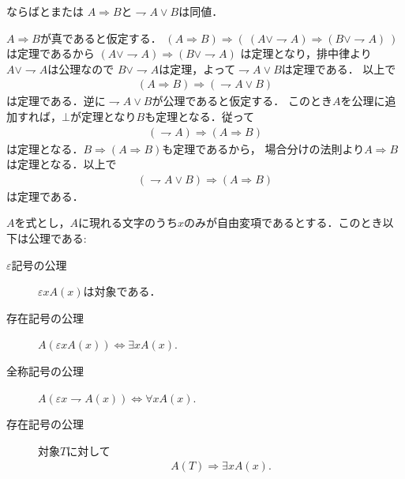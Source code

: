 	\begin{itembox}[l]{ならばとまたは}
		$A \Longrightarrow B$と$\rightharpoondown A \vee B$は同値．
	\end{itembox}
	
	\begin{prf}
		$A \Longrightarrow B$が真であると仮定する．
		$(A \Longrightarrow B) \Longrightarrow (\ (A \vee \rightharpoondown A) \Longrightarrow (B \vee \rightharpoondown A)\ )$は定理であるから
		$(A \vee \rightharpoondown A) \Longrightarrow (B \vee \rightharpoondown A)$
		は定理となり，排中律より$A \vee \rightharpoondown A$は公理なので
		$B \vee \rightharpoondown A$は定理，よって$\rightharpoondown A \vee B$は定理である．
		以上で
		\begin{align}
			(A \Longrightarrow B) \Longrightarrow (\rightharpoondown A \vee B)
		\end{align}
		は定理である．逆に$\rightharpoondown A \vee B$が公理であると仮定する．
		このとき$A$を公理に追加すれば，$\bot$が定理となり$B$も定理となる．従って
		\begin{align}
			(\rightharpoondown A) \Longrightarrow (A \Longrightarrow B)
		\end{align}
		は定理となる．$B \Longrightarrow (A \Longrightarrow B)$も定理であるから，
		場合分けの法則より$A \Longrightarrow B$は定理となる．以上で
		\begin{align}
			(\rightharpoondown A \vee B) \Longrightarrow (A \Longrightarrow B)
		\end{align}
		は定理である．
	\end{prf}
	
	\begin{screen}
		$A$を式とし，$A$に現れる文字のうち$x$のみが自由変項であるとする．このとき以下は公理である:
		\begin{description}
			\item[$\varepsilon$記号の公理] $\varepsilon x A(x)$は対象である．
			\item[存在記号の公理] $A (\varepsilon x A(x)) \Longleftrightarrow \exists x A(x)$.
			\item[全称記号の公理] $A (\varepsilon x \rightharpoondown A(x)) \Longleftrightarrow \forall x A(x)$.
			\item[存在記号の公理] 対象$T$に対して
				\begin{align}
					A(T) \Longrightarrow \exists x A(x).
				\end{align}
		\end{description}
	\end{screen}
	

